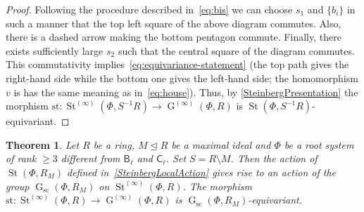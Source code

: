 \documentclass[oneside, 11pt]{amsart}
\numberwithin{equation}{section}
\newtheorem{theorem}{Theorem}
\theoremstyle{definition}
\theoremstyle{remark}
\DeclareMathOperator\St{St}
\DeclareMathOperator\GG{G}
\newcommand{\rB}{\mathsf{B}}
\newcommand{\rC}{\mathsf{C}}
\begin{document}
\begin{proof}
 Following the procedure described in~\eqref{eq:bis} we can choose $s_1$ and $\{b_i\}$ in such a manner that the top left square of the above diagram commutes. Also, there is a dashed arrow making the bottom pentagon commute. Finally, there exists sufficiently large $s_2$ such that the central square of the diagram commutes. This commutativity implies~\eqref{eq:equivariance-statement} (the top path gives the right-hand side while the bottom one gives the left-hand side; the homomorphism $v$ is has the same meaning as in~\eqref{eq:house}). Thus, by \cref{SteinbergPresentation} the morphism \(\mathrm{st} \colon \St^{(\infty)}(\Phi, S^{-1} R) \to \GG^{(\infty)}(\Phi, R)\) is \(\St(\Phi, S^{-1} R)\)-equivariant.
\end{proof}

\begin{theorem}\label{ChevalleyLocalAction}
 Let \(R\) be a ring, \(M \trianglelefteq R\) be a maximal ideal and \(\Phi\) be a root system of rank \(\geq 3\) different from \(\rB_\ell\) and \(\rC_\ell\). Set \(S = R \setminus M\). Then the action of $\St(\Phi, R_M)$ defined in~\cref{SteinbergLocalAction} gives rise to an action of the group \(\GG_{\mathrm{sc}}(\Phi, R_M)\) on \(\St^{(\infty)}(\Phi, R)\). The morphism \(\mathrm{st} \colon \St^{(\infty)}(\Phi, R) \to \GG^{(\infty)}(\Phi, R)\) is \(\GG_{\mathrm{sc}}(\Phi, R_M)\)-equivariant.
\end{theorem}
\end{document}
